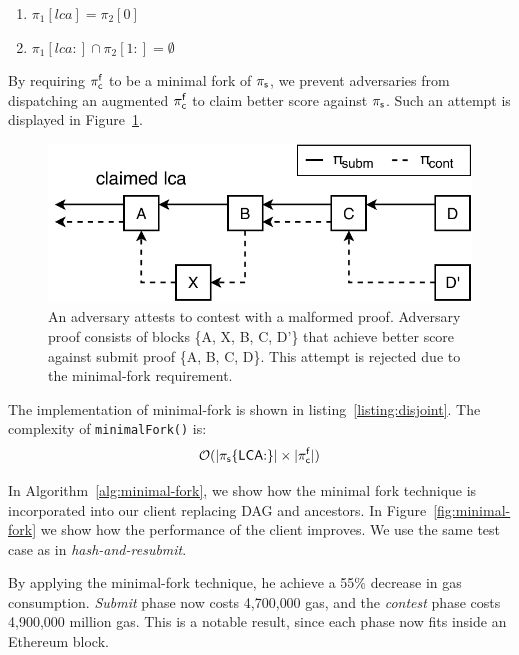 \begin{enumerate}
    \item $\pi_1[lca] = \pi_2[0]$
    \item $\pi_1[lca{:}] \cap \pi_2[1{:}] = \emptyset$
\end{enumerate}

By requiring $\mathsf{\pi_{c}^{f}}$ to be a minimal fork of $\mathsf{\pi_{s}}$, we prevent adversaries
from dispatching an augmented $\mathsf{\pi_{c}^{f}}$ to claim better score against $\mathsf{\pi_{s}}$.
Such an attempt is displayed in Figure~\ref{fig:adversary-minimal-fork}.

\begin{figure}[h]
    \begin{center}
        \includegraphics[width=0.5\columnwidth]{figures/adversary-minimal-fork.pdf}
    \end{center}
    \caption{An adversary attests to contest with a malformed proof. Adversary
        proof consists of blocks \{A, X, B, C, D'\} that achieve better score
        against submit proof \{A, B, C, D\}. This attempt is rejected due to
        the minimal-fork requirement.}
    \label{fig:adversary-minimal-fork}
\end{figure}

The implementation of minimal-fork is shown in listing~\ref{listing:disjoint}.
The complexity of \texttt{minimalFork()} is: \[ \mathcal{O}(|\mathsf{\pi_{s}}\{\mathsf{LCA}{:\}}|
\times |\mathsf{\pi_{c}^{f}}|) \]



In Algorithm~\ref{alg:minimal-fork}, we show how the minimal fork technique is
incorporated into our client replacing DAG and ancestors. In
Figure~\ref{fig:minimal-fork} we show how the performance of the client
improves. We use the same test case as in \emph{hash-and-resubmit}.



By applying the minimal-fork technique, he achieve a 55\% decrease in gas
consumption. \emph{Submit} phase now costs {4{,}700{,}000} gas, and
the \emph{contest} phase costs {4{,}900{,}000} million gas. This is a notable
result, since each phase now fits inside an Ethereum block.

